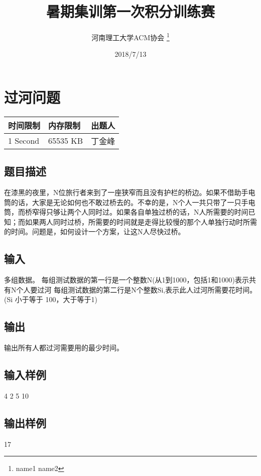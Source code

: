 \documentclass[12pt, a4paper]{article}
\title{暑期集训第一次积分训练赛}
\author{河南理工大学ACM协会 \thanks{name1 name2}}
\date{2018/7/13}
\begin{document}
\maketitle\newpage


\section{过河问题}

\begin{table}[!h]
  \centering
  \begin{tabular}{l|l|l}
  时间限制 & 内存限制 & 出题人 \\
  \hline
  1 Second & 65535 KB & 丁金峰 \\
\end{tabular}
\end{table}

\subsection*{题目描述}
在漆黑的夜里，N位旅行者来到了一座狭窄而且没有护栏的桥边。如果不借助手电筒的话，大家是无论如何也不敢过桥去的。不幸的是，N个人一共只带了一只手电筒，而桥窄得只够让两个人同时过。如果各自单独过桥的话，N人所需要的时间已知；而如果两人同时过桥，所需要的时间就是走得比较慢的那个人单独行动时所需的时间。问题是，如何设计一个方案，让这N人尽快过桥。 

\subsection*{输入}
多组数据。 \newline
每组测试数据的第一行是一个整数N(从1到1000，包括1和1000)表示共有N个人要过河 \newline
每组测试数据的第二行是N个整数Si,表示此人过河所需要花时间。(Si   小于等于 100，大于等于1) \newline

\subsection*{输出}
输出所有人都过河需要用的最少时间。 \newline

\subsection*{输入样例}
4 2 5 10

\subsection*{输出样例}
17

\end{document}
